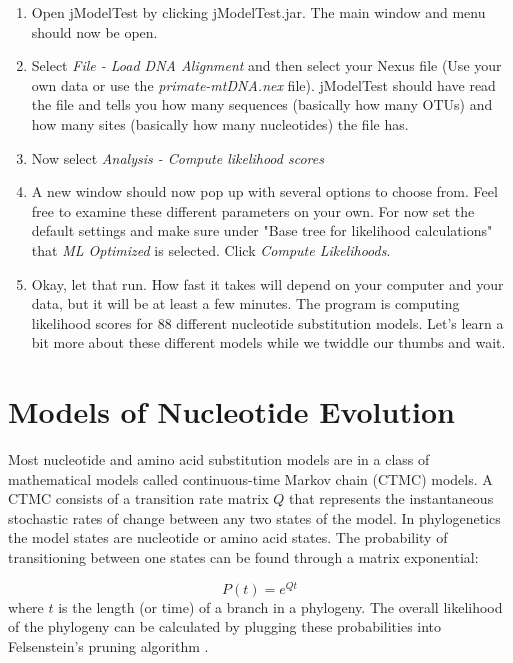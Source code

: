 \documentclass[11pt]{article}
\begin{document}
\begin{enumerate}

\item Open jModelTest by clicking jModelTest.jar. The main window and menu should now be open.

\item Select \textit{File - Load DNA Alignment} and then select your Nexus file (Use your own data or use the \textit{primate-mtDNA.nex} file).  jModelTest should have read the file and tells you how many sequences (basically how many OTUs) and how many sites (basically how many nucleotides) the file has.

\item Now select \textit{Analysis - Compute likelihood scores}

\item A new window should now pop up with several options to choose from.  Feel free to examine these different parameters on your own.  For now set the default settings and make sure under "Base tree for likelihood calculations" that \textit{ML Optimized} is selected. Click \textit{Compute Likelihoods}.

\item Okay, let that run.  How fast it takes will depend on your computer and your data, but it will be at least a few minutes.  The program is computing likelihood scores for 88 different nucleotide substitution models.  Let's learn a bit more about these different models while we twiddle our thumbs and wait.

\end{enumerate}


\section{Models of Nucleotide Evolution}

Most nucleotide and amino acid substitution models are in a class of mathematical models called continuous-time Markov chain (CTMC) models.
A CTMC consists of a transition rate matrix $Q$ that represents the instantaneous stochastic rates of change between any two states of the model.
In phylogenetics the model states are nucleotide or amino acid states.
The probability of transitioning between one states can be found through 
a matrix exponential:

\begin{equation*}
P(t) = e^{Qt}
\end{equation*}
where $t$ is the length (or time) of a branch in a phylogeny. The overall likelihood of the
phylogeny can be calculated by plugging these probabilities into Felsenstein's pruning algorithm \citep{felsenstein1981evolutionary}.
\end{document}
